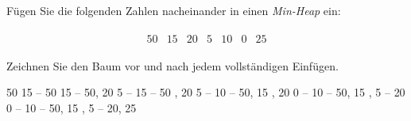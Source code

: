 Fügen Sie die folgenden Zahlen nacheinander in einen
\emph{Min-Heap}
ein:

\begin{align*}
  \begin{array}{ccccccc}
    50 & 15 & 20 & 5 & 10 & 0 & 25
  \end{array}
\end{align*}

Zeichnen Sie den Baum vor und nach jedem vollständigen Einfügen.

\begin{solution}

\begin{tcbraster}[raster columns = 3, raster equal height=rows]
   { 50 }
   { 15 -- 50 }
   { 15 -- { 50, 20 } }
    { 5 -- { { 15 -- 50 }, 20 } }
   { 5 -- { { 10 -- { 50, 15 } }, 20 } }
    { 0 -- { { 10 -- { 50, 15 } }, 5 -- { 20 } } }
   { 0 -- { { 10 -- { 50, 15 } }, 5 -- { 20, 25 } } }
\end{tcbraster}

\end{solution}
